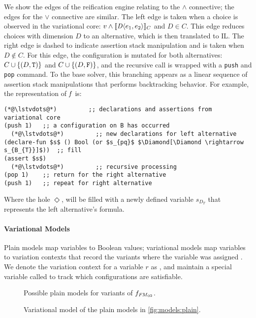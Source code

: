 We show the edges of the reification engine relating to the $\wedge$
connective; the edges for the $\vee$ connective are similar.
The left edge is taken when a choice is observed in
the variational core: $v \wedge \sem[C]{\chc[D]{e_{1}, e_{2}}}$ and $D \in C$.
This edge reduces choices with dimension $D$ to an alternative, which is then
translated to IL. The right edge is dashed to indicate assertion stack
manipulation and is taken when $D \notin C$. For this edge, the configuration
is mutated for both alternatives: $C \cup \{(D, \texttt{T}{})\}$ and $C \cup \{(D,
\texttt{F}{})\}$, and the recursive call is wrapped with a \texttt{push} and
\texttt{pop} command. To the base solver, this branching appears as a linear
sequence of assertion stack manipulations that performs backtracking behavior.
For example, the representation of $\mathit{f}$ is:
%
\begin{lstlisting}[columns=flexible,keepspaces=true]
  (*@\lstvdots@*)         ;; declarations and assertions from variational core
(push 1)   ;; a configuration on B has occurred
  (*@\lstvdots@*)         ;; new declarations for left alternative
(declare-fun $s$ () Bool (or $s_{pq}$ $\Diamond[\Diamond \rightarrow s_{B_{T}}]$))  ;; fill
(assert $s$)
  (*@\lstvdots@*)         ;; recursive processing
(pop 1)    ;; return for the right alternative
(push 1)   ;; repeat for right alternative
\end{lstlisting}
%
Where the hole $\Diamond$, will be filled with a newly defined variable
$s_{D_{T}}$ that represents the left alternative's formula.

\paragraph{Variational Models}%
\label{ssec:vmodels}
%
Plain models map variables to Boolean values; variational models map variables
to variation contexts that record the variants where the variable was assigned
\tru{}. We denote the variation context for a variable $r$ as , and
maintain a special variable called \SatVar{} to track which configurations are
satisfiable.

\begin{figure}
  
  \vspace{-2ex}
  \caption{Possible plain models for variants of $f_{\text{\ensuremath{\mathit{FM}_{02}}}}$.}%
  \label{fig:models:plain}
\end{figure}

\begin{figure}
  
  \caption{Variational model of the plain models in \autoref{fig:models:plain}.}%
  \label{fig:models:var}
\end{figure}


